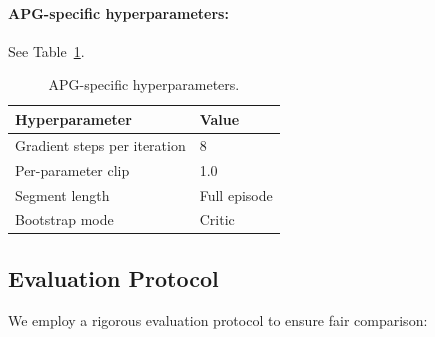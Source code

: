 \documentclass[11pt,a4paper]{article}
\begin{document}
\paragraph{APG-specific hyperparameters:} See Table~\ref{tab:apg_hp}.

\begin{table}[htbp]
  \centering
  \caption{APG-specific hyperparameters.}
  \label{tab:apg_hp}
  \begin{tabular}{@{}ll@{}}
    \toprule
    \textbf{Hyperparameter} & \textbf{Value} \\
    \midrule
    Gradient steps per iteration   & 8 \\
    Per-parameter clip             & 1.0 \\
    Segment length                 & Full episode \\
    Bootstrap mode                 & Critic \\
    \bottomrule
  \end{tabular}
\end{table}

\subsection{Evaluation Protocol}
\label{sec:eval_protocol}

We employ a rigorous evaluation protocol to ensure fair comparison:
\end{document}
